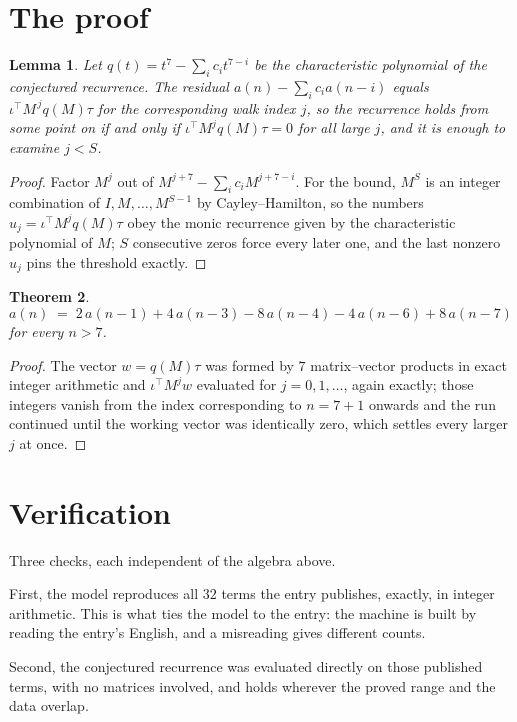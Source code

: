 \documentclass[11pt,a4paper]{article}
\theoremstyle{plain}
\newtheorem{theorem}{Theorem}
\newtheorem{lemma}[theorem]{Lemma}
\theoremstyle{definition}
\begin{document}
\section{The proof}

\begin{lemma}\label{lem:crit}
Let $q(t)=t^{7}-\sum_i c_it^{7-i}$ be the characteristic polynomial of the
conjectured recurrence. The residual $a(n)-\sum_ic_ia(n-i)$ equals
$\iota^{\!\top}M^{\,j}q(M)\tau$ for the corresponding walk index $j$, so the recurrence
holds from some point on if and only if $\iota^{\!\top}M^{j}q(M)\tau=0$ for all large $j$,
and it is enough to examine $j<S$.
\end{lemma}

\begin{proof}
Factor $M^{j}$ out of $M^{j+7}-\sum_ic_iM^{j+7-i}$. For the bound, $M^{S}$
is an integer combination of $I,M,\dots,M^{S-1}$ by Cayley--Hamilton, so the numbers
$u_j=\iota^{\!\top}M^{j}q(M)\tau$ obey the monic recurrence given by the characteristic
polynomial of $M$; $S$ consecutive zeros force every later one, and the last nonzero $u_j$
pins the threshold exactly.
\end{proof}

\begin{theorem}
\[
a(n)\;=\;2\,a(n-1) + 4\,a(n-3) - 8\,a(n-4) - 4\,a(n-6) + 8\,a(n-7)
\]
for every $n>7$.
\end{theorem}

\begin{proof}
The vector $w=q(M)\tau$ was formed by $7$ matrix--vector products in exact integer
arithmetic and $\iota^{\!\top}M^{j}w$ evaluated for $j=0,1,\dots$, again exactly; those
integers vanish from the index corresponding to $n=7+1$ onwards and the run continued
until the working vector was identically zero, which settles every larger $j$ at once.
\end{proof}

\section{Verification}

Three checks, each independent of the algebra above.

First, the model reproduces all $32$ terms the entry publishes, exactly, in integer
arithmetic. This is what ties the model to the entry: the machine is built by reading the
entry's English, and a misreading gives different counts.

Second, the conjectured recurrence was evaluated directly on those published terms, with no
matrices involved, and holds wherever the proved range and the data overlap.
\end{document}
